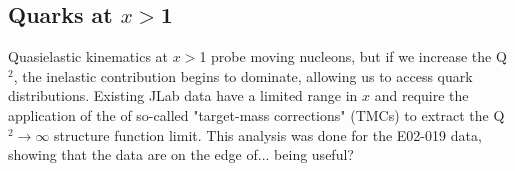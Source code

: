 \subsection{Quarks at $x>$1}
Quasielastic kinematics at $x>$1 probe moving nucleons, but if we increase the Q$^2$, the inelastic contribution begins to dominate, allowing us to access quark distributions. Existing JLab data have a limited range in $x$ and require the application of the of so-called "target-mass corrections" (TMCs) to extract the Q$^2\rightarrow\infty$ structure function limit.  This analysis was done for the E02-019 data, showing that the data are on the edge of... being useful?


